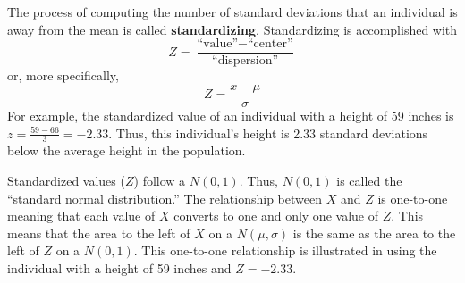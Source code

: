 \documentclass[10pt,openany]{book}\usepackage[]{graphicx}\usepackage[]{color}
\begin{document}
The process of computing the number of standard deviations that an individual is away from the mean is called \textbf{standardizing}. Standardizing is accomplished with
\begin{equation}
  \label{eqn:Zgeneral}
    Z = \frac{\text{``value''}-\text{``center''}}{\text{``dispersion''}}
\end{equation}
or, more specifically,
\begin{equation}
  \label{eqn:Zspecific}
    Z = \frac{x-\mu}{\sigma}
\end{equation}
For example, the standardized value of an individual with a height of 59 inches is $z=\frac{59-66}{3}=-2.33$. Thus, this individual's height is 2.33 standard deviations below the average height in the population.

Standardized values ($Z$) follow a $N(0,1)$. Thus, $N(0,1)$ is called the ``standard normal distribution.''  The relationship between $X$ and $Z$ is one-to-one meaning that each value of $X$ converts to one and only one value of $Z$. This means that the area to the left of $X$ on a $N(\mu,\sigma)$ is the same as the area to the left of $Z$ on a $N(0,1)$. This one-to-one relationship is illustrated in  using the individual with a height of 59 inches and $Z=-2.33$.

\vspace{-6pt}
\end{document}
